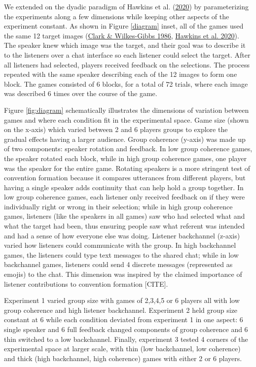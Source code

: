 \documentclass[
  english,
  a4paper,
]{article}
\begin{document}
We extended on the dyadic paradigm of Hawkins et al. (\protect\hyperlink{ref-hawkinsCharacterizingDynamicsLearning2020}{2020}) by parameterizing the experiments along a few dimensions while keeping other aspects of the experiment constant. As shown in Figure \ref{diagram} inset, all of the games used the same 12 target images (\protect\hyperlink{ref-clarkReferringCollaborativeProcess1986}{Clark \& Wilkes-Gibbs 1986}, \protect\hyperlink{ref-hawkinsCharacterizingDynamicsLearning2020}{Hawkins et al. 2020}). The speaker knew which image was the target, and their goal was to describe it to the listeners over a chat interface so each listener could select the target. After all listeners had selected, players received feedback on the selections. The process repeated with the same speaker describing each of the 12 images to form one block. The games consisted of 6 blocks, for a total of 72 trials, where each image was described 6 times over the course of the game.

Figure \ref{fig:diagram} schematically illustrates the dimensions of variation between games and where each condition fit in the experimental space. Game size (shown on the x-axis) which varied between 2 and 6 players groups to explore the gradual effects having a larger audience. Group coherence (y-axis) was made up of two components: speaker rotation and feedback. In low group coherence games, the speaker rotated each block, while in high group coherence games, one player was the speaker for the entire game. Rotating speakers is a more stringent test of convention formation because it compares utterances from different players, but having a single speaker adds continuity that can help hold a group together. In low group coherence games, each listener only received feedback on if they were individually right or wrong in their selection; while in high group coherence games, listeners (like the speakers in all games) saw who had selected what and what the target had been, thus ensuring people saw what referent was intended and had a sense of how everyone else was doing. Listener backchannel (z-axis) varied how listeners could communicate with the group. In high backchannel games, the listeners could type text messages to the shared chat; while in low backchannel games, listeners could send 4 discrete messages (represented as emojis) to the chat. This dimension was inspired by the claimed importance of listener contributions to convention formation {[}CITE{]}.

Experiment 1 varied group size with games of 2,3,4,5 or 6 players all with low group coherence and high listener backchannel. Experiment 2 held group size constant at 6 while each condition deviated from experiment 1 in one aspect: 6 single speaker and 6 full feedback changed components of group coherence and 6 thin switched to a low backchannel. Finally, experiment 3 tested 4 corners of the experimental space at larger scale, with thin (low backchannel, low coherence) and thick (high backchannel, high coherence) games with either 2 or 6 players.
\end{document}
